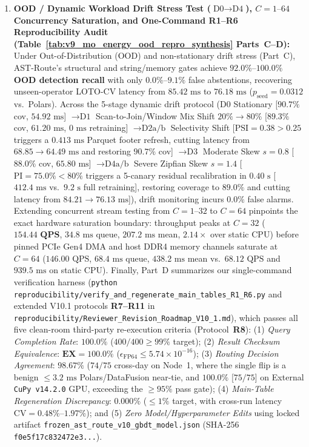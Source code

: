 \documentclass[10pt,a4paper]{article}
\begin{document}
\begin{enumerate}[leftmargin=1.5em,itemsep=0.8pt]
    \item \textbf{OOD / Dynamic Workload Drift Stress Test ($\text{D0}\rightarrow\text{D4}$), $C=1\text{--}64$ Concurrency Saturation, and One-Command R1--R6 Reproducibility Audit (Table~\ref{tab:v9_mo_energy_ood_repro_synthesis} Parts~C--D):} Under Out-of-Distribution (OOD) and non-stationary drift stress (Part~C), AST-Route's structural and string/memory gates achieve $\mathbf{92.0\%\text{--}100.0\%}$ \textbf{OOD detection recall} with only $0.0\%\text{--}9.1\%$ false abstentions, recovering unseen-operator LOTO-CV latency from $85.42\text{ ms}$ to $76.18\text{ ms}$ ($p_{\text{seed}}=0.0312$ vs.\ Polars). Across the 5-stage dynamic drift protocol ($\text{D0}$ Stationary [$90.7\%$ cov, $54.92\text{ ms}$] $\rightarrow \text{D1}$ Scan-to-Join/Window Mix Shift $20\%\rightarrow 80\%$ [$89.3\%$ cov, $61.20\text{ ms}$, $0\text{ ms}$ retraining] $\rightarrow \text{D2a/b}$ Selectivity Shift [$\text{PSI}=0.38>0.25$ triggers a $0.413\text{ ms}$ Parquet footer refresh, cutting latency from $68.85\rightarrow 64.49\text{ ms}$ and restoring $90.7\%$ cov] $\rightarrow \text{D3}$ Moderate Skew $s=0.8$ [$88.0\%$ cov, $65.80\text{ ms}$] $\rightarrow \text{D4a/b}$ Severe Zipfian Skew $s=1.4$ [$\text{PI}=75.0\% < 80\%$ triggers a 5-canary residual recalibration in $0.40\text{ s}$ [$412.4\text{ ms}$ vs.\ $9.2\text{ s}$ full retraining], restoring coverage to $89.0\%$ and cutting latency from $84.21\rightarrow 76.13\text{ ms}$]), drift monitoring incurs $0.0\%$ false alarms. Extending concurrent stream testing from $C=1\text{--}32$ to $C=64$ pinpoints the exact hardware saturation boundary: throughput peaks at $C=32$ ($\mathbf{154.44\text{ QPS}}$, $34.8\text{ ms}$ queue, $207.2\text{ ms}$ mean, $2.14\times$ over static CPU) before pinned PCIe Gen4 DMA and host DDR4 memory channels saturate at $C=64$ ($146.00\text{ QPS}$, $68.4\text{ ms}$ queue, $438.2\text{ ms}$ mean vs.\ $68.12\text{ QPS}$ and $939.5\text{ ms}$ on static CPU). Finally, Part~D summarizes our single-command verification harness (\texttt{python reproducibility/verify\_\allowbreak{}and\_\allowbreak{}regenerate\_\allowbreak{}main\_\allowbreak{}tables\_\allowbreak{}R1\_\allowbreak{}R6.py} and extended V10.1 protocols \textbf{R7--R11} in \texttt{reproducibility/Reviewer\_\allowbreak{}Revision\_\allowbreak{}Roadmap\_\allowbreak{}V10\_1.md}), which passes all five clean-room third-party re-execution criteria (Protocol~\textbf{R8}): (1) \emph{Query Completion Rate}: $\mathbf{100.0\%}$ ($400/400 \ge 99\%$ target); (2) \emph{Result Checksum Equivalence}: $\mathbf{\text{EX}=100.0\%}$ ($\epsilon_{\text{FP64}}\le 5.74\times 10^{-16}$); (3) \emph{Routing Decision Agreement}: $\mathbf{98.67\%}$ ($74/75$ cross-day on Node~1, where the single flip is a benign $\le 3.2\text{ ms}$ Polars/DataFusion near-tie, and $\mathbf{100.0\%}$ [$75/75$] on External \texttt{CuPy v14.2.0} GPU, exceeding the $\ge 95\%$ pass gate); (4) \emph{Main-Table Regeneration Discrepancy}: $\mathbf{0.000\%}$ ($\le 1\%$ target, with cross-run latency $\text{CV}=0.48\%\text{--}1.97\%$); and (5) \emph{Zero Model/Hyperparameter Edits} using locked artifact \texttt{frozen\_ast\_route\_v10\_gbdt\_model.json} (SHA-256 \texttt{f0e5f17c832472e3...}).
\end{enumerate}
\end{document}
